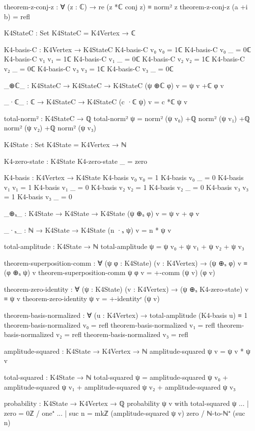 \documentclass[11pt,a4paper]{book}
\begin{document}
\begin{code}
theorem-z-conj-z : ∀ (z : ℂ) → re (z *ℂ conj z) ≡ norm² z
theorem-z-conj-z (a +i b) = refl

K4StateC : Set
K4StateC = K4Vertex → ℂ

K4-basis-C : K4Vertex → K4StateC
K4-basis-C v₀ v₀ = 1ℂ
K4-basis-C v₀ _  = 0ℂ
K4-basis-C v₁ v₁ = 1ℂ
K4-basis-C v₁ _  = 0ℂ
K4-basis-C v₂ v₂ = 1ℂ
K4-basis-C v₂ _  = 0ℂ
K4-basis-C v₃ v₃ = 1ℂ
K4-basis-C v₃ _  = 0ℂ

_⊕ℂ_ : K4StateC → K4StateC → K4StateC
(ψ ⊕ℂ φ) v = ψ v +ℂ φ v

_·ℂ_ : ℂ → K4StateC → K4StateC
(c ·ℂ ψ) v = c *ℂ ψ v

total-norm² : K4StateC → ℚ
total-norm² ψ = norm² (ψ v₀) +ℚ norm² (ψ v₁) +ℚ norm² (ψ v₂) +ℚ norm² (ψ v₃)

K4State : Set
K4State = K4Vertex → ℕ

K4-zero-state : K4State
K4-zero-state _ = zero

K4-basis : K4Vertex → K4State
K4-basis v₀ v₀ = 1
K4-basis v₀ _  = 0
K4-basis v₁ v₁ = 1
K4-basis v₁ _  = 0
K4-basis v₂ v₂ = 1
K4-basis v₂ _  = 0
K4-basis v₃ v₃ = 1
K4-basis v₃ _  = 0

_⊕ₛ_ : K4State → K4State → K4State
(ψ ⊕ₛ φ) v = ψ v + φ v

_·ₛ_ : ℕ → K4State → K4State
(n ·ₛ ψ) v = n * ψ v

total-amplitude : K4State → ℕ
total-amplitude ψ = ψ v₀ + ψ v₁ + ψ v₂ + ψ v₃

theorem-superposition-comm : ∀ (ψ φ : K4State) (v : K4Vertex) →
  (ψ ⊕ₛ φ) v ≡ (φ ⊕ₛ ψ) v
theorem-superposition-comm ψ φ v = +-comm (ψ v) (φ v)

theorem-zero-identity : ∀ (ψ : K4State) (v : K4Vertex) →
  (ψ ⊕ₛ K4-zero-state) v ≡ ψ v
theorem-zero-identity ψ v = +-identityʳ (ψ v)

theorem-basis-normalized : ∀ (u : K4Vertex) → 
  total-amplitude (K4-basis u) ≡ 1
theorem-basis-normalized v₀ = refl
theorem-basis-normalized v₁ = refl
theorem-basis-normalized v₂ = refl
theorem-basis-normalized v₃ = refl


amplitude-squared : K4State → K4Vertex → ℕ
amplitude-squared ψ v = ψ v * ψ v

total-squared : K4State → ℕ
total-squared ψ = amplitude-squared ψ v₀ + amplitude-squared ψ v₁ 
                + amplitude-squared ψ v₂ + amplitude-squared ψ v₃

probability : K4State → K4Vertex → ℚ
probability ψ v with total-squared ψ
... | zero    = 0ℤ / one⁺
... | suc n   = mkℤ (amplitude-squared ψ v) zero / ℕ-to-ℕ⁺ (suc n)


\end{code}
\end{document}
